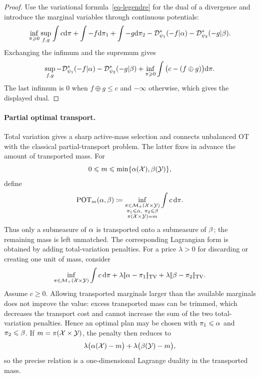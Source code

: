 \begin{proof}
	Use the variational formula~\eqref{eq-legendre} for the dual of a divergence and introduce the marginal variables through continuous potentials:
	\[
	\inf_{\pi\geqslant0}\sup_{f,g}
	\int c\mathrm{d}\pi + \int -f\mathrm{d}\pi_1 + \int -g\mathrm{d}\pi_2
	-
	\mathcal{D}_{\psi_1}^*(-f|\alpha)
	-
	\mathcal{D}_{\psi_2}^*(-g|\beta).
	\]
	Exchanging the infimum and the supremum gives
	\[
	\sup_{f,g}
	-
	\mathcal{D}_{\psi_1}^*(-f|\alpha)
	-
	\mathcal{D}_{\psi_2}^*(-g|\beta)
	+
	\inf_{\pi\geqslant0}\int\big(c-(f\oplus g)\big)\mathrm{d}\pi.
	\]
	The last infimum is $0$ when $f\oplus g\leq c$ and $-\infty$ otherwise, which gives the displayed dual.
\end{proof}

\paragraph{Partial optimal transport.}
Total variation gives a sharp active-mass selection and connects unbalanced OT with the classical partial-transport problem. The latter fixes in advance the amount of transported mass. For
\[
	0\leqslant m\leqslant \min\{\alpha(\mathcal{X}),\beta(\mathcal{Y})\},
\]
define
\[
	\operatorname{POT}_m(\alpha,\beta)
	\coloneqq
	\inf_{\substack{\pi\in\mathcal{M}_+(\mathcal{X}\times\mathcal{Y})\\
	\pi_1\leqslant\alpha,\ \pi_2\leqslant\beta\\
	\pi(\mathcal{X}\times\mathcal{Y})=m}}
	\int c\,\mathrm{d}\pi .
\]
Thus only a submeasure of $\alpha$ is transported onto a submeasure of $\beta$; the remaining mass is left unmatched. The corresponding Lagrangian form is obtained by adding total-variation penalties. For a price $\lambda>0$ for discarding or creating one unit of mass, consider
\[
	\inf_{\pi\in\mathcal{M}_+(\mathcal{X}\times\mathcal{Y})}
	\int c\,\mathrm{d}\pi
	+
	\lambda|\!| \alpha-\pi_1 |\!|_{\operatorname{TV}}
	+
	\lambda|\!| \beta-\pi_2 |\!|_{\operatorname{TV}}.
\]
Assume $c\geq0$. Allowing transported marginals larger than the available marginals does not improve the value: excess transported mass can be trimmed, which decreases the transport cost and cannot increase the sum of the two total-variation penalties. Hence an optimal plan may be chosen with $\pi_1\leqslant\alpha$ and $\pi_2\leqslant\beta$. If $m=\pi(\mathcal{X}\times\mathcal{Y})$, the penalty then reduces to
\[
	\lambda\big(\alpha(\mathcal{X})-m\big)+\lambda\big(\beta(\mathcal{Y})-m\big),
\]
	so the precise relation is a one-dimensional Lagrange duality in the transported mass.

